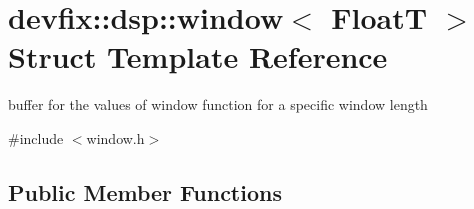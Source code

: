 \hypertarget{structdevfix_1_1dsp_1_1window}{}\section{devfix\+:\+:dsp\+:\+:window$<$ FloatT $>$ Struct Template Reference}
\label{structdevfix_1_1dsp_1_1window}


buffer for the values of window function for a specific window length  




{\ttfamily \#include $<$window.\+h$>$}

\subsection*{Public Member Functions}
